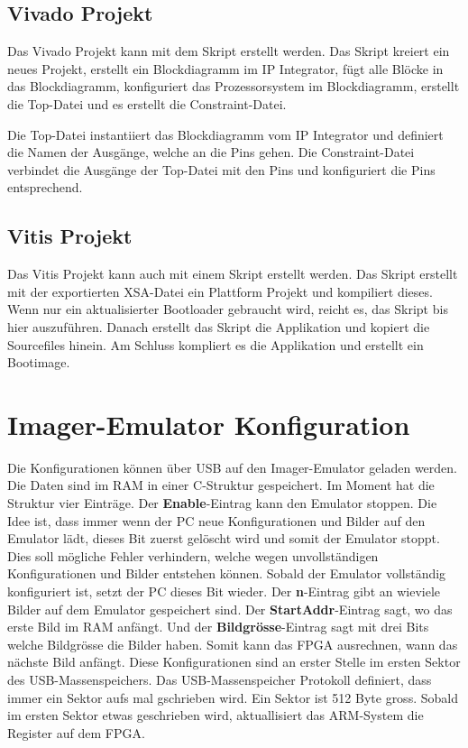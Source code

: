 \documentclass{article}
\begin{document}
\subsection{Vivado Projekt}
Das Vivado Projekt kann mit dem Skript erstellt werden. Das Skript kreiert ein neues Projekt, erstellt ein Blockdiagramm im IP Integrator, fügt alle Blöcke in das Blockdiagramm, konfiguriert das Prozessorsystem im Blockdiagramm, erstellt die Top-Datei und es erstellt die Constraint-Datei.

Die Top-Datei instantiiert das Blockdiagramm vom IP Integrator und definiert die Namen der Ausgänge, welche an die Pins gehen. Die Constraint-Datei verbindet die Ausgänge der Top-Datei mit den Pins und konfiguriert die Pins entsprechend. 

\subsection{Vitis Projekt}
Das Vitis Projekt kann auch mit einem Skript erstellt werden. Das Skript erstellt mit der exportierten XSA-Datei ein Plattform Projekt und kompiliert dieses. Wenn nur ein aktualisierter Bootloader gebraucht wird, reicht es, das Skript bis hier auszuführen. Danach erstellt das Skript die Applikation und kopiert die Sourcefiles hinein. Am Schluss kompliert es die Applikation und erstellt ein Bootimage.

\section{Imager-Emulator Konfiguration}
Die Konfigurationen können über USB auf den Imager-Emulator geladen werden. Die Daten sind im RAM in einer C-Struktur gespeichert. Im Moment hat die Struktur vier Einträge. Der \textbf{Enable}-Eintrag kann den Emulator stoppen. Die Idee ist, dass immer wenn der PC neue Konfigurationen und Bilder auf den Emulator lädt, dieses Bit zuerst gelöscht wird und somit der Emulator stoppt. Dies soll mögliche Fehler verhindern, welche wegen unvollständigen Konfigurationen und Bilder entstehen können. Sobald der Emulator vollständig konfiguriert ist, setzt der PC dieses Bit wieder. Der \textbf{n}-Eintrag gibt an wieviele Bilder auf dem Emulator gespeichert sind. Der \textbf{StartAddr}-Eintrag sagt, wo das erste Bild im RAM anfängt. Und der \textbf{Bildgrösse}-Eintrag sagt mit drei Bits welche Bildgrösse die Bilder haben. Somit kann das FPGA ausrechnen, wann das nächste Bild anfängt. Diese Konfigurationen sind an erster Stelle im ersten Sektor des USB-Massenspeichers. Das USB-Massenspeicher Protokoll definiert, dass immer ein Sektor aufs mal gschrieben wird. Ein Sektor ist 512 Byte gross. Sobald im ersten Sektor etwas geschrieben wird, aktuallisiert das ARM-System die Register auf dem FPGA.
\end{document}
